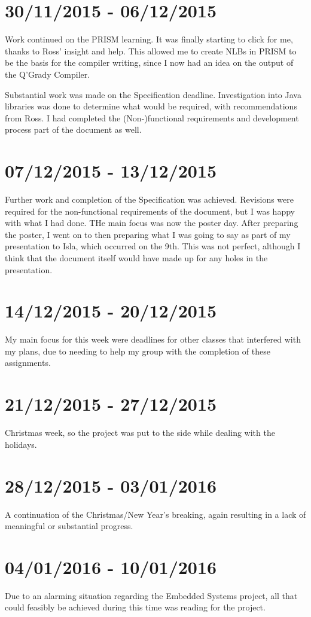 \documentclass[11pt, a4paper]{article}
\begin{document}
\section{30/11/2015 - 06/12/2015}
Work continued on the PRISM learning. It was finally starting to click for me,
thanks to Ross' insight and help. This allowed me to create NLBs in PRISM to be
the basis for the compiler writing, since I now had an idea on the output of the
Q'Grady Compiler.

Substantial work was made on the Specification deadline. Investigation into Java libraries was done to determine what would be required, with recommendations
from Ross. I had completed the (Non-)functional requirements and development
process part of the document as well.

\section{07/12/2015 - 13/12/2015}
Further work and completion of the Specification was achieved. Revisions were
required for the non-functional requirements of the document, but I was happy
with what I had done. THe main focus was now the poster day. After preparing the
poster, I went on to then preparing what I was going to say as part of my
presentation to Isla, which occurred on the 9th. This was not perfect, although
I think that the document itself would have made up for any holes in the
presentation.

\section{14/12/2015 - 20/12/2015}
My main focus for this week were deadlines for other classes that interfered
with my plans, due to needing to help my group with the completion of these
assignments.

\section{21/12/2015 - 27/12/2015}
Christmas week, so the project was put to the side while dealing with the
holidays.

\section{28/12/2015 - 03/01/2016}
A continuation of the Christmas/New Year's breaking, again resulting in a lack
of meaningful or substantial progress.

\section{04/01/2016 - 10/01/2016}
Due to an alarming situation regarding the Embedded Systems project, all that
could feasibly be achieved during this time was reading for the project.
\end{document}
